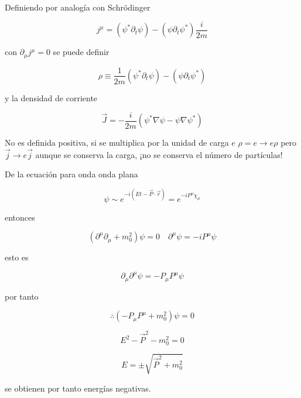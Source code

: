 \documentclass{report}
\begin{document}
Definiendo por analogía con Schrödinger

\begin{equation}
j^{\mu} = (\psi^{*} \partial_{t} \psi)-(\psi \partial_{t}\psi^{*}) \frac{i}{2m}
\end{equation}

con $\partial_{\mu} j^{\mu} = 0$ se puede definir

\begin{equation}
\rho \equiv \frac{1}{2m} (\psi^{*}\partial _{t} \psi) - (\psi \partial_{t} \psi^{*})
\end{equation}

y la densidad de corriente 

\begin{equation}
\overrightarrow{J} = -\frac{i}{2m} (\psi^{*} \nabla \psi - \psi \nabla \psi^{*})
\end{equation}

No es definida positiva, si se multiplica por la unidad de carga $e$ $\rho = e \rightarrow e\rho$ pero $\overrightarrow{j} \rightarrow e \overrightarrow{j}$ aunque se conserva la carga, ¡no se conserva el número de partículas!

De la ecuación para onda onda plana

\begin{equation}
\psi \sim e^{-i(Et-\overrightarrow{P} \cdot \overrightarrow{r})} = e^{-i P^{\mu} \chi _{\mu}}
\end{equation}

entonces

\begin{equation}
(\partial^{\mu} \partial_{\mu} + m_{0}^{2})\psi = 0 \quad \partial^{\mu} \psi = -i P^{\mu} \psi
\end{equation}

esto es 

\[\partial_{\mu} \partial^{\mu} \psi = - P_{\mu} P^{\mu} \psi \]

por tanto 

\[\therefore (-P_{\mu}P^{\mu} + m_{0}^2)\psi = 0 \]

\[E^2 - \overrightarrow{P}^2 - m_{0}^2 = 0\]

\begin{equation}
E = \pm \sqrt{\overrightarrow{P}^2 + m_{0}^2}
\end{equation}

se obtienen por tanto energías negativas.


\end{document}
